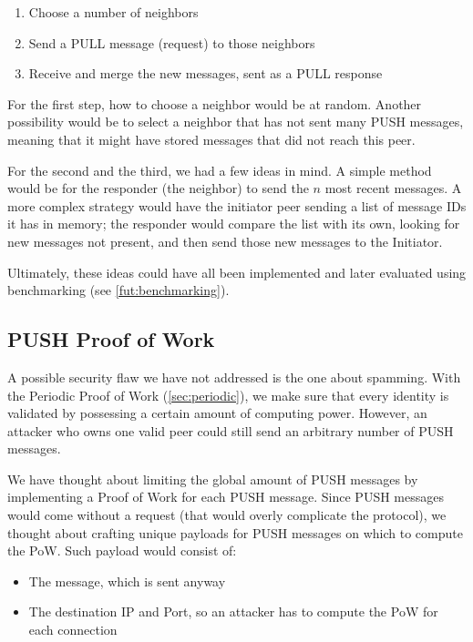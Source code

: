 \documentclass[a4paper,english,10pt,NET]{tumarticle}
\begin{document}
\begin{enumerate}
    \item Choose a number of neighbors
    \item Send a PULL message (request) to those neighbors
    \item Receive and merge the new messages, sent as a PULL response
\end{enumerate}

For the first step, how to choose a neighbor would be at random. Another possibility would be to select a neighbor that has not sent many PUSH messages, meaning that it might have stored messages that did not reach this peer.

For the second and the third, we had a few ideas in mind. A simple method would be for the responder (the neighbor) to send the $n$ most recent messages. A more complex strategy would have the initiator peer sending a list of message IDs it has in memory; the responder would compare the list with its own, looking for new messages not present, and then send those new messages to the Initiator.

Ultimately, these ideas could have all been implemented and later evaluated using benchmarking (see \cref{fut:benchmarking}).

\subsection{PUSH Proof of Work}

A possible security flaw we have not addressed is the one about spamming. With the Periodic Proof of Work (\cref{sec:periodic}), we make sure that every identity is validated by possessing a certain amount of computing power. However, an attacker who owns one valid peer could still send an arbitrary number of PUSH messages.

We have thought about limiting the global amount of PUSH messages by implementing a Proof of Work for each PUSH message. Since PUSH messages would come without a request (that would overly complicate the protocol), we thought about crafting unique payloads for PUSH messages on which to compute the PoW. Such payload would consist of:

\begin{itemize}
    \item The message, which is sent anyway
    \item The destination IP and Port, so an attacker has to compute the PoW for each connection
\end{itemize}
\end{document}
